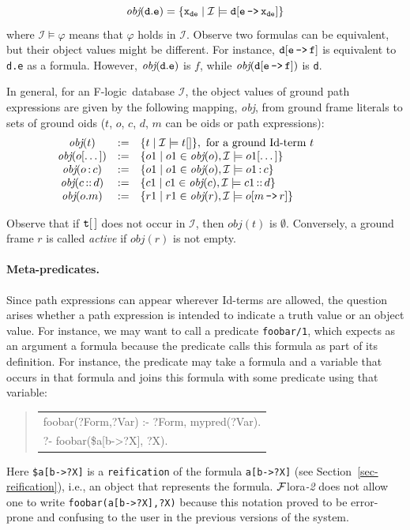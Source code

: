 \documentclass[11pt]{article}
\newcommand{\FLSYSTEM}{{\mbox{\sc ${\cal F}${lora}\rm\emph{-2}}}\xspace}
\newenvironment{qrules}{\begin{quote}\tt\begin{tabular}[t]{l}}%
{\end{tabular}\end{quote}}
\newcommand{\obj}{\textit{obj}\xspace}
\newcommand{\db}[1]{\ensuremath{\mathcal{#1}}}
\newcommand{\isa}{\,{\bf{:}}\,}
\newcommand{\subcl}{\,{\bf{::}}\,}
\newcommand{\mvd}{{\mbox{\tt \,->\,}}}  %
\newcommand{\fl}{\mbox{F-logic}\xspace}
\begin{document}
\begin{displaymath} \tt
\obj(d.e) = \{x_{de} \mid \db I \models d[e\mvd 
x_{de}]\} 
\end{displaymath}
%
where $\db I \models \varphi$ means that $\varphi$ holds in \db I.  Observe
two formulas can be equivalent, but their object values might be different.
For instance, $\tt d[e\mvd f]$ is equivalent to {\tt d.e} as a formula.
However, $\tt \obj(d.e)$ is $f$, while $\tt \obj(d[e\mvd f])$ is {\tt d}.

In general, for an \fl\ database \db I, the object values of ground path
expressions are given by the following mapping, \obj, from ground frame
literals
to sets of ground oids ($t$, $o$, $c$, $d$, $m$ can be oids or path
expressions):
%
\begin{displaymath}
  \begin{array}{cll@{\hspace{4em}}c}
    \obj(t) & := & \{t \mid  \db I\models t[] \}, 
     \textrm{ for a ground Id-term $t$}  \\   
    \obj(o[\dots]) & := & \{o1 \mid o1\in\obj(o), \db I \models o1[\dots]
    \} \\  
    \obj(o\isa c) & := & \{o1 \mid o1\in\obj(o), \db I \models o1\isa c\}
     \\ 
    \obj(c\subcl d) & := & \{c1 \mid c1\in\obj(c), \db I \models c1\subcl
    d\} \\ 
    \obj(o.m) & :=  & \{r1 \mid r1\in\obj(r), \db I \models o[m\mvd
    r]\}  
  \end{array}
\end{displaymath}

Observe that if $\tt t[\,]$ does not occur in \db{I}, then $\obj(t)$ is
$\emptyset$.  Conversely, a ground frame $r$ is called \emph{active} if
$\obj(r)$ is not empty.

\paragraph{Meta-predicates.}
Since path expressions can appear wherever Id-terms are allowed, the
question arises whether a path expression is intended to indicate a truth
value or an object value. For instance, we may want to call a
predicate {\tt foobar/1}, which expects as an argument
a formula because the predicate calls this formula as part of its definition.
For instance, the predicate may take a formula and a variable that occurs
in that formula and joins this formula with some predicate using that
variable:
\begin{qrules}
  foobar(?Form,?Var) :- ?Form, mypred(?Var).\\
  ?- foobar(\${a[b->?X]}, ?X).
\end{qrules}
Here \texttt{\${a[b->?X]}} is a \texttt{reification} of the formula
\texttt{a[b->?X]} (see Section~\ref{sec-reification}), i.e., an object that
represents the formula.  \FLSYSTEM does not allow one to write
\texttt{foobar(a[b->?X],?X)} because this notation proved to be error-prone
and confusing to the user in the previous versions of the system.
\end{document}
